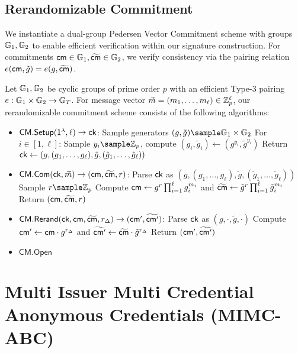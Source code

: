 \subsection{Rerandomizable Commitment}
We instantiate a dual-group Pedersen Vector Commitment scheme with groups $\mathbb{G}_1, \mathbb{G}_2$ to enable efficient verification within our signature construction. For commitments $\mathsf{cm} \in \mathbb{G}_1, \widetilde{\mathsf{cm}} \in \mathbb{G}_2$, we verify consistency via the pairing relation $e(\mathsf{cm}, \tilde{g}) = e(g, \widetilde{\mathsf{cm}})$.

Let $\mathbb{G}_1, \mathbb{G}_2$ be cyclic groups of prime order $p$ with an efficient Type-3 pairing $e: \mathbb{G}_1 \times \mathbb{G}_2 \to \mathbb{G}_T$. For message vector $\vec{m} = (m_1, \ldots, m_\ell) \in \mathbb{Z}_p^\ell$, our rerandomizable commitment scheme consists of the following algorithms:

\begin{itemize}
    \item $\mathsf{CM.Setup}(\mathsf{1^{\lambda}}, \ell) \to \mathsf{ck}$:
    Sample generators $(g, \tilde{g}) \sample \G_1 \times \G_2$
    For $i \in [1,\ell]$: Sample $y_i \sample \Z_p$, compute $(g_i, \tilde{g}_i) \gets (g^{y_i}, \tilde{g}^{y_i})$
    Return $\mathsf{ck} \gets (g, (g_1,\ldots,g_\ell), \tilde{g}, (\tilde{g}_1,\ldots,\tilde{g}_\ell))$
    
    \item $\mathsf{CM.Com}(\mathsf{ck}, \vec{m}) \to (\mathsf{cm}, \widetilde{\mathsf{cm}}, r)$:
    Parse $\mathsf{ck}$ as $(g, (g_1,\ldots,g_\ell), \tilde{g}, (\tilde{g}_1,\ldots,\tilde{g}_\ell))$
    Sample $r \sample \Z_p$
    Compute $\mathsf{cm} \gets g^r \prod_{i=1}^\ell g_i^{m_i}$ and $\widetilde{\mathsf{cm}} \gets \tilde{g}^r \prod_{i=1}^\ell \tilde{g}_i^{m_i}$
    Return $(\mathsf{cm}, \widetilde{\mathsf{cm}}, r)$
    
    \item $\mathsf{CM.Rerand}(\mathsf{ck}, \mathsf{cm}, \widetilde{\mathsf{cm}}, r_\Delta) \to (\mathsf{cm}', \widetilde{\mathsf{cm}'})$:
    Parse $\mathsf{ck}$ as $(g, \cdot, \tilde{g}, \cdot)$
    Compute $\mathsf{cm}' \gets \mathsf{cm} \cdot g^{r_\Delta}$ and $\widetilde{\mathsf{cm}'} \gets \widetilde{\mathsf{cm}} \cdot \tilde{g}^{r_\Delta}$
    Return $(\mathsf{cm}', \widetilde{\mathsf{cm}'})$

    \item $\mathsf{CM.Open}$
\end{itemize}







\section{Multi Issuer Multi Credential Anonymous Credentials (MIMC-ABC)}\label{sec:mimc}


